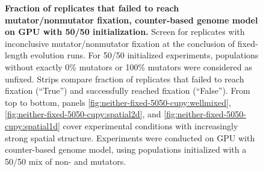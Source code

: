 \begin{figure}[h]
  \begin{minipage}{\textwidth}
    \caption{%
      \textbf{Fraction of replicates that failed to reach mutator/nonmutator  fixation, counter-based genome model on GPU with 50/50 initialization.}
      \footnotesize
      Screen for replicates with inconclusive mutator/nonmutator  fixation at the conclusion of fixed-length evolution runs.
      For 50/50 initialized experiments, populations without exactly 0\% mutators or 100\% mutators were considered as unfixed.
      Strips compare fraction of replicates that failed to reach fixation (``True'') and successfully reached fixation (``False'').
      From top to bottom, panels \ref{fig:neither-fixed-5050-cupy:wellmixed}, \ref{fig:neither-fixed-5050-cupy:spatial2d}, and \ref{fig:neither-fixed-5050-cupy:spatial1d} cover experimental conditions with increasingly strong spatial structure.
      Experiments were conducted on GPU with counter-based genome model, using populations initialized with a 50/50 mix of non- and mutators.
}
    \label{fig:neither-fixed-5050-cupy}
  \end{minipage}
\end{figure}
